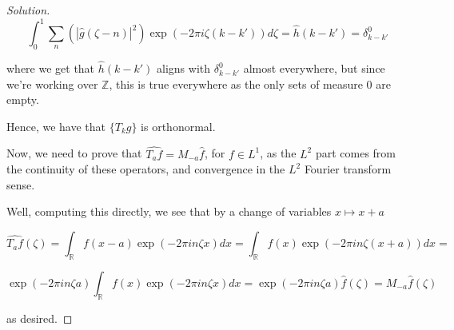 \documentclass[10pt]{article}
\begin{document}
\begin{proof}[Solution]
$$ \int_0^1 \sum_{n}\left( | \hat{g}(\zeta - n)|^2 \right)  \exp(-2\pi i \zeta (k- k') ) d\zeta  = \hat{h}(k - k') = \delta_{k-k'}^0$$

where we get that $\hat{h}(k-k')$ aligns with $\delta_{k - k'}^0$ almost everywhere, but since we're working over $\mathbb{Z}$, this is true everywhere as the only sets of measure 0 are empty.

Hence, we have that $ \{ T_k g \}$ is orthonormal.

Now, we need to prove that $\hat{T_a f} = M_{-a} \hat{f}$, for $f \in L^1$, as the $L^2$ part comes from the continuity of these operators, and convergence in the $L^2$ Fourier transform sense.

Well, computing this directly, we see that by a change of variables $x \mapsto x +a$

$$ \hat{T_a f}(\zeta) = \int_{\mathbb{R}} f(x-a) \exp(-2\pi i n \zeta x ) dx = \int_{\mathbb{R}} f(x) \exp(-2\pi i n \zeta (x + a)) dx =$$

$$\exp(-2\pi i n \zeta a) \int_{\mathbb{R}} f(x) \exp(-2\pi i n \zeta x) dx =\exp(-2\pi i n \zeta a) \hat{f}(\zeta) = M_{-a} \hat{f}(\zeta) $$

as desired.



\end{proof}
\end{document}
